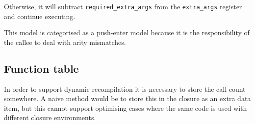 Otherwise, it will subtract \texttt{required\_extra\_args} from the \texttt{extra\_args} register
and continue executing.

This model is categorised as a push-enter model because it is the responsibility of the callee to
deal with arity mismatches.








\subsection{Function table}

In order to support dynamic recompilation it is necessary to store the call count somewhere. A
naive method would be to store this in the closure as an extra data item, but this cannot support
optimising cases where the same code is used with different closure environments.


